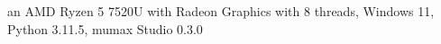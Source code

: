an AMD Ryzen 5 7520U with Radeon Graphics with 8 threads, Windows 11, Python 3.11.5, mumax Studio 0.3.0
